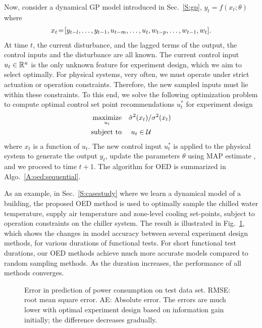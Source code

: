 Now, consider a dynamical GP model introduced in Sec.~\ref{S:gp},
\begin{math}
y_{t} = f(x_t;\theta)
\end{math}
where
\begin{align}
x_{t}\!=\![y_{t-l}, \dots, y_{t-1}, u_{t-m}, \dots, u_t, w_{t-p}, \dots, w_{t-1}, w_t] \text.
\label{E:GP:features}
\end{align}
At time \(t\), the current disturbance, and the lagged terms of the output, the control inputs and the disturbance are all known. The current control input \(u_t \in \mathbb{R}^u \) is the only unknown feature for experiment design, which we aim to select optimally.
For physical systems, very often, we must operate under strict actuation or operation constraints. Therefore, the new sampled inputs must lie within these constraints. To this end, we solve the following optimization problem to compute optimal control set point recommendations \(u^*_t\) for experiment design
\begin{align}
\label{E:oed:sampling}
\maximize_{u_{t}} & \ \ \ \tilde{\sigma}^2(x_t)/{\sigma}^2(x_t) \\
\st &  \ \ \ \   u_t \in \mathcal{U} \nonumber
\end{align}
where \(x_t\) is a function of \(u_t\). The new control input \(u^*_t\) is applied to the physical system to generate the output \(y_t\), update the parameters \(\theta\) using MAP estimate \cite{Garnett2013}, and we proceed to time \(t+1\). 
The algorithm for OED is summarized in Algo.~\ref{A:oed:sequential}.

As an example, in Sec.~\ref{S:casestudy} where we learn a dynamical model of a building, the proposed OED method is used to optimally sample the chilled water temperature, supply air temperature and zone-level cooling set-points, subject to operation constraints on the chiller system.
The result is illustrated in Fig.~\ref{F:oed:example}, which shows the changes in model accuracy between several experiment design methods, for various durations of functional tests.
For short functional test durations, our OED methods achieve much more accurate models compared to random sampling methods.  As the duration increases, the performance of all methods converges.

\begin{figure}[!tb]
  \centering
  \setlength{}
  \setlength{}	
  
  \caption{Error in prediction of power consumption on test data set. RMSE: root mean square error. AE: Absolute error. The errors are much lower with optimal experiment design based on information gain initially; the difference decreases gradually.}
  \captionsetup{justification=centering}
  \label{F:oed:example}
\end{figure}


